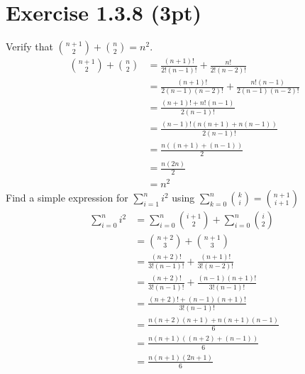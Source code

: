 \documentclass{article}
\begin{document}
\section*{Exercise 1.3.8 (3pt)}
Verify that $\binom{n+1}{2} + \binom{n}{2} = n^2$.
\begin{align*}
	\binom{n+1}{2} + \binom{n}{2} &= \frac{(n+1)!}{2!(n-1)!} + \frac{n!}{2!(n-2)!} \\
				      &= \frac{(n+1)!}{2(n-1)(n-2)!} + \frac{n!(n-1)}{2(n-1)(n-2)!} \\
				      &= \frac{(n+1)! + n!(n-1)}{2(n-1)!} \\
				      &= \frac{(n-1)!(n(n+1) + n(n-1))}{2(n-1)!} \\
				      &= \frac{n((n+1) + (n-1))}{2} \\
				      &= \frac{n(2n)}{2} \\
				      &= n^2
\end{align*}
Find a simple expression for $\sum_{i=1}^{n} i^2$ using $ \sum_{k=0}^{n} \binom{k}{i} = \binom{n+1}{i+1} $
\begin{align*}
	\sum_{i=0}^{n} i^2 &= \sum_{i=0}^n \binom{i+1}{2} + \sum_{i=0}^n\binom{i}{2} \\
			   &= \binom{n+2}{3} + \binom{n+1}{3} \\
			   &= \frac{(n+2)!}{3!(n-1)!} + \frac{(n+1)!}{3!(n-2)!} \\
			   &= \frac{(n+2)!}{3!(n-1)!} + \frac{(n-1)(n+1)!}{3!(n-1)!} \\
			   &= \frac{(n+2)! + (n-1)(n+1)!}{3!(n-1)!} \\
			   &= \frac{n(n+2)(n+1) + n(n+1)(n-1)}{6} \\
			   &= \frac{n(n+1)((n+2) + (n-1))}{6} \\
			   &= \frac{n(n+1)(2n+1)}{6}
\end{align*}
\end{document}
